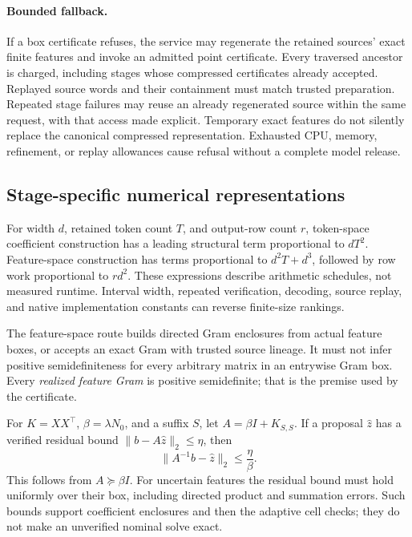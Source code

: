 \documentclass[10pt,twocolumn,letterpaper]{article}
\begin{document}
\paragraph{Bounded fallback.}
If a box certificate refuses, the service may regenerate the retained sources'
exact finite features and invoke an admitted point certificate. Every traversed
ancestor is charged, including stages whose compressed certificates already
accepted. Replayed source words and their containment must match trusted
preparation. Repeated stage failures may reuse an already regenerated source
within the same request, with that access made explicit. Temporary exact features
do not silently replace the canonical compressed representation. Exhausted CPU,
memory, refinement, or replay allowances cause refusal without a complete model
release.

\subsection{Stage-specific numerical representations}
For width $d$, retained token count $T$, and output-row count $r$, token-space
coefficient construction has a leading structural term proportional to $dT^2$.
Feature-space construction has terms proportional to $d^2T+d^3$, followed by
row work proportional to $rd^2$. These expressions describe arithmetic schedules,
not measured runtime. Interval width, repeated verification, decoding, source
replay, and native implementation constants can reverse finite-size rankings.

The feature-space route builds directed Gram enclosures from actual feature
boxes, or accepts an exact Gram with trusted source lineage. It must not infer
positive semidefiniteness for every arbitrary matrix in an entrywise Gram box.
Every \emph{realized feature Gram} is positive semidefinite; that is the premise
used by the certificate.

For $K=XX^\top$, $\beta=\lambda N_0$, and a suffix $S$, let
$A=\beta I+K_{S,S}$. If a proposal $\widehat z$ has a verified residual bound
$\|b-A\widehat z\|_2\leq\eta$, then
\begin{equation}
 \|A^{-1}b-\widehat z\|_2\leq\frac{\eta}{\beta}.
 \label{eq:residual}
\end{equation}
This follows from $A\succeq\beta I$. For uncertain features the residual bound
must hold uniformly over their box, including directed product and summation
errors. Such bounds support coefficient enclosures and then the adaptive cell
checks; they do not make an unverified nominal solve exact.
\end{document}
